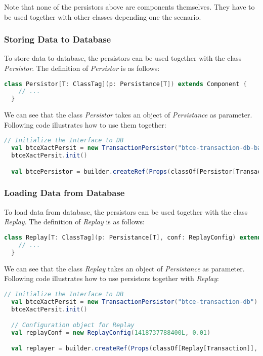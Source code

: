 Note that none of the persistors above are components themselves. They have to be used together with other classes depending one the scenario.

\subsubsection{Storing Data to Database}

To store data to database, the persistors can be used together with the class \emph{Persistor}. The definition of \emph{Persistor} is as follows:

\begin{lstlisting}[language=Scala]
  class Persistor[T: ClassTag](p: Persistance[T]) extends Component {
    // ...
  }
\end{lstlisting}

We can see that the class \emph{Persistor} takes an object of \emph{Persistance} as parameter. Following code illustrates how to use them together:

\begin{lstlisting}[language=Scala]
  // Initialize the Interface to DB
  val btceXactPersit = new TransactionPersistor("btce-transaction-db-batch")
  btceXactPersit.init()

  val btcePersistor = builder.createRef(Props(classOf[Persistor[Transaction]], btceXactPersit, implicitly[ClassTag[Transaction]]), "btcePersistor")
\end{lstlisting}

\subsubsection{Loading Data from Database}

To load data from database, the persistors can be used together with the class \emph{Replay}. The definition of \emph{Replay} is as follows:

\begin{lstlisting}[language=Scala]
  class Replay[T: ClassTag](p: Persistance[T], conf: ReplayConfig) extends Component {
    // ...
  }
\end{lstlisting}

We can see that the class \emph{Replay} takes an object of \emph{Persistance} as parameter. Following code illustrates how to use persistors together with \emph{Replay}:

\begin{lstlisting}[language=Scala]
  // Initialize the Interface to DB
  val btceXactPersit = new TransactionPersistor("btce-transaction-db")
  btceXactPersit.init()

  // Configuration object for Replay
  val replayConf = new ReplayConfig(1418737788400L, 0.01)

  val replayer = builder.createRef(Props(classOf[Replay[Transaction]], btceXactPersit, replayConf, implicitly[ClassTag[Transaction]]), "replayer")
\end{lstlisting}

